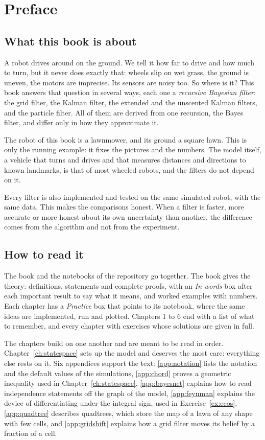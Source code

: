 \chapter*{Preface}

\section*{What this book is about}

A robot drives around on the ground. We tell it how far to drive
and how much to turn, but it never does exactly that: wheels slip on wet
grass, the ground is uneven, the motors are imprecise. Its sensors are
noisy too. So where is it? This book answers that question in several ways,
each one a \emph{recursive Bayesian filter}: the grid filter, the Kalman
filter, the extended and the unscented Kalman filters, and the particle
filter. All of them are derived from one recursion, the Bayes filter, and
differ only in how they approximate it.

The robot of this book is a lawnmower, and its ground a square lawn. This
is only the running example: it fixes the pictures and the numbers. The
model itself, a vehicle that turns and drives and that measures distances
and directions to known landmarks, is that of most wheeled robots, and the
filters do not depend on it.

Every filter is also implemented and tested on the same simulated robot,
with the same data. This makes the comparisons honest. When a filter is
faster, more accurate or more honest about its own uncertainty than
another, the difference comes from the algorithm and not from the
experiment.

\section*{How to read it}

The book and the notebooks of the repository go together. The book gives
the theory: definitions, statements and complete proofs, with an
\emph{In words} box after each important result to say what it means, and
worked examples with numbers. Each chapter has a \emph{Practice} box that
points to its notebook, where the same ideas are implemented, run and
plotted. Chapters 1 to 6 end with a list of what to remember, and every
chapter with exercises whose solutions are given in full.

The chapters build on one another and are meant to be read in order.
Chapter~\ref{ch:statespace} sets up the model and deserves the most care:
everything else rests on it. Six appendices support the text:
\cref{app:notation} lists the notation and the default values of the
simulations, \cref{app:chord} proves a geometric inequality used in
Chapter~\ref{ch:statespace}, \cref{app:bayesnet} explains how to read
independence statements off the graph of the model, \cref{app:feynman}
explains the device of differentiating under the integral sign, used in
Exercise~\ref{ex:ecos}, \cref{app:quadtree} describes quadtrees,
which store the map of a lawn of any shape with few cells, and
\cref{app:gridshift} explains how a grid filter moves its belief by a
fraction of a cell.

